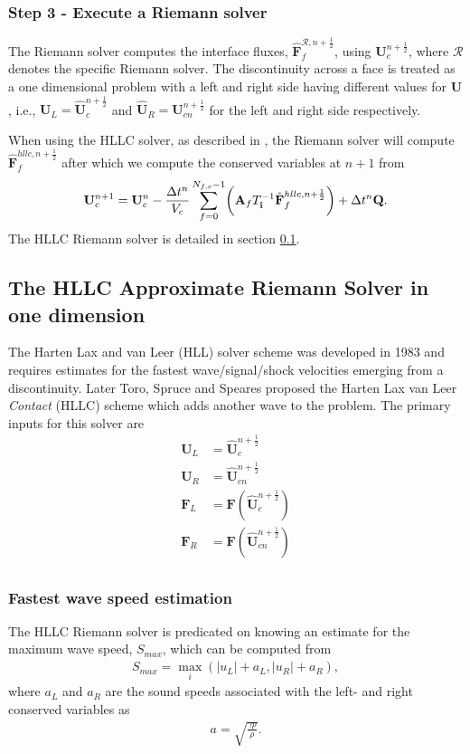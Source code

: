 \documentclass[10pt,letterpaper,notitlepage]{article}
\numberwithin{equation}{section}
\newcommand{\uvec}[1]{\boldsymbol{\hat{\textbf{#1}}}}
\newcommand{\ihat}{\uvec{\i}}
\newcommand{\hatbf}[1]{\hat{\mathbf{#1}}}
\newcommand{\beqn}{\begin{equation}\begin{aligned}}
\newcommand{\eeqn}{\end{aligned}\end{equation}}
\begin{document}
\subsubsection{Step 3 - Execute a Riemann solver}
The Riemann solver computes the interface fluxes, $\hatbf{F}_f^{\mathcal{R},n{+}\frac{1}{2}}$, using $\mathbf{U}_c^{n{+}\frac{1}{2}}$, where $\mathcal{R}$ denotes the specific Riemann solver. The discontinuity across a face is treated as a one dimensional problem with a left and right side having different values for $\mathbf{U}$, i.e., $\mathbf{U}_L = \hatbf{U}_c^{n{+}\frac{1}{2}}$ and $\hatbf{U}_R = \mathbf{U}_{cn}^{n{+}\frac{1}{2}}$ for the left and right side respectively.


When using the HLLC solver, as described in \cite{Toro}, the Riemann solver will compute $\hatbf{F}_f^{hllc,n{+}\frac{1}{2}}$ after which we compute the conserved variables at $n+1$ from
\beqn 
\mathbf{U}_c^{n+1} = \mathbf{U}_c^n - \frac{\Delta t^n}{V_c} \sum_{f=0}^{N_{f,c}{-1}} 
\biggr(
\mathbf{A}_f T_{\ihat}^{-1}
\hatbf{F}_f^{hllc,n{+}\frac{1}{2}}
\biggr)
+ \Delta t^n \mathbf{Q}.
\eeqn 
The HLLC Riemann solver is detailed in section \ref{section:HLLC}.

\newpage 
\subsection{The HLLC Approximate Riemann Solver in one dimension} \label{section:HLLC}
The Harten Lax and van Leer (HLL) solver scheme was developed in 1983 \cite{Toro} and requires estimates for the fastest wave/signal/shock velocities emerging from a discontinuity. Later Toro, Spruce and Speares proposed the Harten Lax van Leer \textit{Contact} (HLLC) scheme \cite{Toro} which adds another wave to the problem.
\newline
\newline
The primary inputs for this solver are
\beqn 
\mathbf{U}_L &= \hatbf{U}_c^{n{+}\frac{1}{2}} \\
\mathbf{U}_R &= \hatbf{U}_{cn}^{n{+}\frac{1}{2}} \\
\mathbf{F}_L &= \mathbf{F}(\hatbf{U}_{c}^{n{+}\frac{1}{2}}) \\
\mathbf{F}_R &= \mathbf{F}(\hatbf{U}_{cn}^{n{+}\frac{1}{2}}) \\
\eeqn 


\subsubsection{Fastest wave speed estimation}
The HLLC Riemann solver is predicated on knowing an estimate for the maximum wave speed, $S_{max}$, which can be computed from 
\beqn
S_{max} =\max_i (|{u}_L| + a_L, |{u}_R| + a_R),
\eeqn
where $a_L$ and $a_R$ are the sound speeds associated with the left- and right conserved variables as
\beqn 
a = \sqrt{\frac{\gamma p}{\rho}}.
\eeqn 
\end{document}
